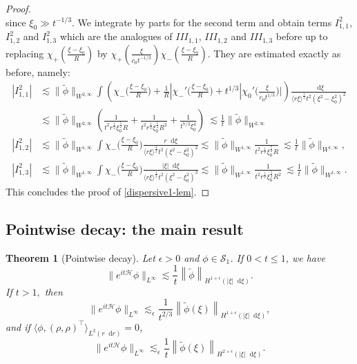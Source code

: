 \documentclass[11 pt]{amsart}
\newtheorem{thm}{Theorem}[section]
\theoremstyle{definition}
\theoremstyle{remark}
\numberwithin{equation}{section}
\newcommand{\dd}{\mathop{}\!\mathrm{d}}
\begin{document}
\begin{proof}
$$$$
since $\xi_0\gg t^{-1/3}$. We integrate by parts for the second term and obtain terms $I_{1,1}^2$, $I_{1,2}^2$ and $I_{1,3}^2$ which are the analogues of $III_{1,1}$, $III_{1,2}$ and $III_{1,3}$ before up to replacing $ \chi_+\left( \frac{\xi - \xi_0}{R} \right) $ by $\chi_+\left(\frac{\xi}{c_0t^{-1/3}}\right) \chi_-\left( \frac{\xi - \xi_0}{R} \right) $. They are estimated exactly as before, namely:
\begin{align*}
|I_{1,1}^2| & \lesssim \| \tilde \phi \|_{W^{2,\infty}} \int \left( \chi_-\big( \frac{\xi - \xi_0}{R}\big)+\frac{1}{R}|\chi_-'\big( \frac{\xi - \xi_0}{R}\big)+t^{1/3}|\chi_0'\big( \frac{\xi}{c_0t^{1/3}}\big)| \right) \frac{\dd\xi}{\langle r \xi\rangle^{\frac 12}t^2(\xi^2-\xi_0^2)^2} \\
&\lesssim  \| \tilde \phi \|_{W^{2,\infty}}\left(\frac{1}{t^2r^{\frac 12}\xi_0^{\frac 52}R}+\frac{1}{t^2r^{\frac 12}\xi_0^{\frac 52}R^2}+\frac{1}{t^{7/3}\xi_0^4}\right) \ \lesssim \frac 1t \| \tilde \phi \|_{W^{2,\infty}} \\
|I_{1,2}^2| & \lesssim \| \tilde \phi \|_{W^{1,\infty}} \int  \chi_-\big( \frac{\xi - \xi_0}{R}\big)  \frac{r \dd\xi}{\langle r \xi\rangle^{\frac 32}t^2(\xi^2-\xi_0^2)^2} \lesssim \| \tilde \phi \|_{W^{1,\infty}} \frac{1}{t^2r^{\frac 12}\xi_0^{\frac 72}R} \ \lesssim \frac 1t \| \tilde \phi \|_{W^{1,\infty}},\\
|I_{1,3}^2| & \lesssim \| \tilde \phi \|_{W^{1,\infty}} \int \chi_-\big( \frac{\xi - \xi_0}{R}\big) \frac{|\xi| \dd\xi}{\langle r \xi\rangle^{\frac 12}t^2(\xi^2-\xi_0^2)^3} \lesssim  \| \tilde \phi \|_{W^{1,\infty}} \frac{1}{t^2r^{\frac 12}\xi_0^{\frac 52}R^2} \ \lesssim \frac 1t \| \tilde \phi \|_{W^{1,\infty}}.
\end{align*}
This concludes the proof of \eqref{dispersive1-lem}.
\end{proof}

\subsection{Pointwise decay: the main result}
\begin{thm}[Pointwise decay] 
\label{thmpointwisedecay}
Let $\epsilon>0$ and $\phi \in \mathcal S_1$. If $0<t\leqslant 1$, we have
$$
 \| e^{it \mathcal{H}} \phi \|_{L^\infty} \lesssim \frac{1}{t} \left\| \widetilde{\phi} \right\|_{H^{1+\epsilon}(|\xi|\dd \xi)}.
$$
If $t>1,$ then
\begin{equation}
\| e^{it \mathcal{H}} \phi \|_{L^\infty} \lesssim_\epsilon \frac{1}{t^{2/3}}  \left\|  \widetilde{\phi}(\xi) \right\|_{H^{1+\epsilon}(|\xi|\dd \xi)},  \label{dispersive2}
\end{equation}
and if $\langle \phi , (\rho,\rho)^\top \rangle_{L^2(r \dd r)} =0$,
\begin{equation}
\label{dispersive1}
 \| e^{it \mathcal{H}} \phi \|_{L^\infty}  \lesssim_\epsilon \frac{1}{t}  \left\|  \widetilde{\phi}(\xi) \right\|_{H^{2+\epsilon}(|\xi|\dd \xi)} .
\end{equation}
\end{thm}
\end{document}
